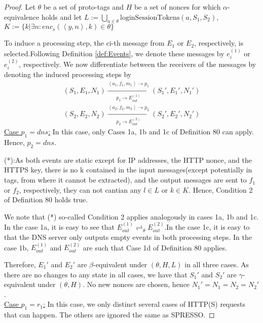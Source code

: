 \documentclass[letterpaper,onecolumn,10pt]{article}
\begin{document}
\begin{proof}
  Let $\theta$ be a set of proto-tags and $H$ be a set of nonces for which $\alpha$-equivalence holds and let $L:=\bigcup_{a\in\theta}\text{loginSessionTokens}(a,S_1,S_2)$,$K:=\{k|\exists n:enc_s(\left \langle y,n\right \rangle,k)\in\theta\}$\par
  To induce a processing step, the ci-th message from $E_1$ or $E_2$, respectively, is selected.Following Definition \ref{def:Events}, we denote these messages by $e_i^{(1)}$ or $e_i^{(2)}$, respectively. We now differentiate between the receivers of the messages by denoting the induced processing steps by
  \begin{equation}
    \begin{aligned}
      (S_1,E_1,N_1)\xrightarrow[p_1\rightarrow E_{out}^{(1)}]{\left \langle a_1,f_1,m_1\right \rangle\rightarrow p_1}(S_1\prime,E_1\prime,N_1\prime)\\
      (S_2,E_2,N_2)\xrightarrow[p_2\rightarrow E_{out}^{(2)}]{\left \langle a_2,f_2,m_2\right \rangle\rightarrow p_2}(S_2\prime,E_2\prime,N_2\prime)
    \end{aligned}
  \end{equation}
  \underline{Case $p_1=dns$:}
  In this case, only Cases 1a, 1b and 1c of Definition 80 can apply. Hence, $p_2=dns$.\par
  (*):As both events are static except for IP addresses, the HTTP nonce, and the HTTPS key, there is no k contained in the input messages(except potentially in tags, from where it cannot be extracted), and the output messages are sent to $f_1$ or $f_2$, respectively, they can not cantian any $l\in L$ or $k\in K$. Hence, Condition 2 of Definition 80 holds true.\par
  We note that (*) so-called Condition 2 applies analogously in cases 1a, 1b and 1c.
  In the case 1a, it is easy to see that $E_{out}^{(1)}\rightleftharpoons_\theta E_{out}^{(2)}$.In the case 1c, it is easy to that the DNS server only outputs empty events in both processing steps. In the case 1b, $E_{out}^{(1)}$ and $E_{out}^{(2)}$ are such that Case 1d of Definition 80 applies.\par
  Therefore, $E_1\prime$ and $E_2\prime$ are $\beta$-equivalent under $(\theta,H,L)$ in all three cases. As there are no changes to any state in all cases, we have that $S_1\prime$ and $S_2\prime$ are $\gamma$-equivalent under $(\theta,H)$. No new nonces are chosen, hence $N_1\prime=N_1=N_2=N_2\prime$.\\
  \underline{Case $p_1=r_1$:}
  In this case, we only distinct several cases of HTTP(S) requests that can happen. The others are ignored the same as SPRESSO.\par

\end{proof}
\end{document}
